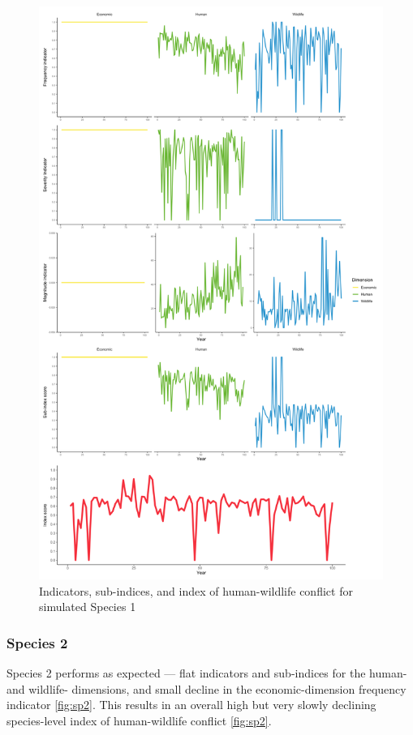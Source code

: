 \documentclass[fleqn,10pt]{olplainarticle}
\begin{document}
\begin{figure}
    \centering
    \includegraphics[width = 1\textwidth]
    {sp1_all.png}
    \caption{Indicators, sub-indices, and index of human-wildlife conflict for simulated Species 1}
    \label{fig:sp1}
\end{figure}

\subsubsection*{Species 2}
Species 2 performs as expected --- flat indicators and sub-indices for the human- and wildlife-  dimensions, and small decline in the economic-dimension frequency indicator \ref{fig:sp2}. This results in an overall high but very slowly declining species-level index of human-wildlife conflict \ref{fig:sp2}.
\end{document}

